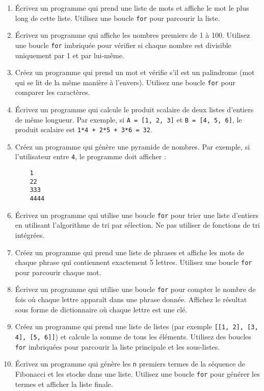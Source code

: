 \begin{enumerate}

    \item Écrivez un programme qui prend une liste de mots et affiche le mot le plus long de cette liste. Utilisez une boucle \texttt{for} pour parcourir la liste.

    \item Écrivez un programme qui affiche les nombres premiers de 1 à 100. Utilisez une boucle \texttt{for} imbriquée pour vérifier si chaque nombre est divisible uniquement par 1 et par lui-même.

    \item Créez un programme qui prend un mot et vérifie s’il est un palindrome (mot qui se lit de la même manière à l’envers). Utilisez une boucle \texttt{for} pour comparer les caractères.

    \item Écrivez un programme qui calcule le produit scalaire de deux listes d'entiers de même longueur. Par exemple, si \texttt{A = [1, 2, 3]} et \texttt{B = [4, 5, 6]}, le produit scalaire est \texttt{1*4 + 2*5 + 3*6 = 32}.

    \item Créez un programme qui génère une pyramide de nombres. Par exemple, si l'utilisateur entre \texttt{4}, le programme doit afficher : 
    \begin{verbatim}
    1
    22
    333
    4444
    \end{verbatim}

    \item Écrivez un programme qui utilise une boucle \texttt{for} pour trier une liste d’entiers en utilisant l'algorithme de tri par sélection. Ne pas utiliser de fonctions de tri intégrées.

    \item Créez un programme qui prend une liste de phrases et affiche les mots de chaque phrase qui contiennent exactement 5 lettres. Utilisez une boucle \texttt{for} pour parcourir chaque mot.

    \item Écrivez un programme qui utilise une boucle \texttt{for} pour compter le nombre de fois où chaque lettre apparaît dans une phrase donnée. Affichez le résultat sous forme de dictionnaire où chaque lettre est une clé.

    \item Créez un programme qui prend une liste de listes (par exemple \texttt{[[1, 2], [3, 4], [5, 6]]}) et calcule la somme de tous les éléments. Utilisez des boucles \texttt{for} imbriquées pour parcourir la liste principale et les sous-listes.

    \item Écrivez un programme qui génère les \texttt{n} premiers termes de la séquence de Fibonacci et les stocke dans une liste. Utilisez une boucle \texttt{for} pour générer les termes et afficher la liste finale.

\end{enumerate}


